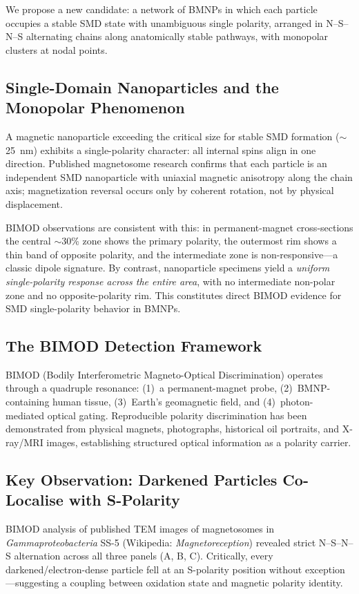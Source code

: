 \documentclass[12pt,a4paper]{article}
\begin{document}
We propose a new candidate: a network of BMNPs in which each particle
occupies a stable SMD state with unambiguous single polarity, arranged
in N--S--N--S alternating chains along anatomically stable pathways,
with monopolar clusters at nodal points.

\subsection{Single-Domain Nanoparticles and the Monopolar Phenomenon}
A magnetic nanoparticle exceeding the critical size for stable SMD
formation ($\sim$25~nm) exhibits a single-polarity character: all
internal spins align in one direction.  Published magnetosome research
\cite{kornig2020} confirms that each particle is an independent SMD
nanoparticle with uniaxial magnetic anisotropy along the chain axis;
magnetization reversal occurs only by coherent rotation, not by physical
displacement.

BIMOD observations are consistent with this: in permanent-magnet
cross-sections the central $\sim$30\% zone shows the primary polarity,
the outermost rim shows a thin band of opposite polarity, and the
intermediate zone is non-responsive---a classic dipole signature.
By contrast, nanoparticle specimens yield a \emph{uniform single-polarity
response across the entire area}, with no intermediate non-polar zone
and no opposite-polarity rim.  This constitutes direct BIMOD evidence
for SMD single-polarity behavior in BMNPs.

\subsection{The BIMOD Detection Framework}
BIMOD (Bodily Interferometric Magneto-Optical Discrimination) operates
through a quadruple resonance: (1)~a permanent-magnet probe, (2)~BMNP-
containing human tissue, (3)~Earth's geomagnetic field, and (4)~photon-
mediated optical gating.  Reproducible polarity discrimination has been
demonstrated from physical magnets, photographs, historical oil
portraits, and X-ray/MRI images, establishing structured optical
information as a polarity carrier.

\subsection{Key Observation: Darkened Particles Co-Localise with S-Polarity}
BIMOD analysis of published TEM images of magnetosomes in
\textit{Gammaproteobacteria} SS-5 (Wikipedia: \textit{Magnetoreception})
revealed strict N--S--N--S alternation across all three panels (A, B,
C).  Critically, every darkened/electron-dense particle fell at an
S-polarity position without exception---suggesting a coupling between
oxidation state and magnetic polarity identity.
\end{document}
